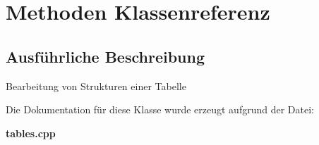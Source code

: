 \section{Methoden Klassenreferenz}
\label{class_methoden}


\subsection{Ausführliche Beschreibung}
Bearbeitung von Strukturen einer Tabelle 

Die Dokumentation für diese Klasse wurde erzeugt aufgrund der Datei\+:\begin{DoxyCompactItemize}
\item 
\textbf{ tables.\+cpp}\end{DoxyCompactItemize}
